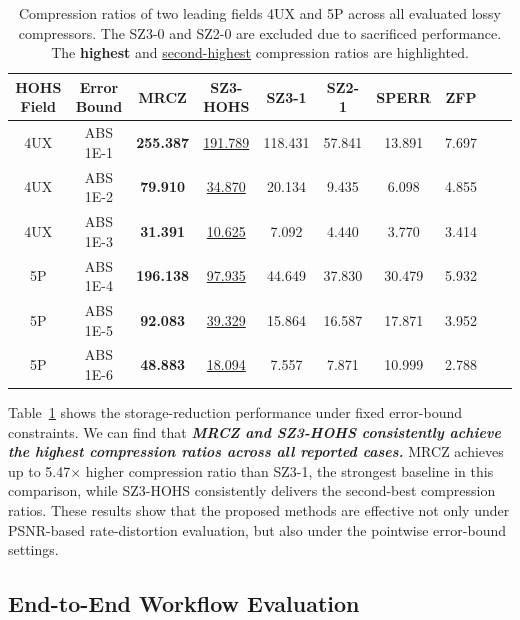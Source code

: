 \begin{table}[h]
    \centering
    \caption{Compression ratios of two leading fields 4UX and 5P across all evaluated lossy compressors. The SZ3-0 and SZ2-0 are excluded due to sacrificed performance. The \textbf{highest} and \underline{second-highest} compression ratios are highlighted.}
    \label{tab:compression-ratios}
    \begin{tabular}{c|c|cccccccc}\toprule
        \textbf{HOHS Field} & \textbf{Error Bound} & \textbf{MRCZ}    & \textbf{SZ3-HOHS} & \textbf{SZ3-1}   & \textbf{SZ2-1}  & \textbf{SPERR}  & \textbf{ZFP} \\
        \midrule
        4UX                     & ABS 1E-1   & \textbf{255.387} & \underline{191.789}  & 118.431 & 57.841 & 13.891 & 7.697\\
        4UX                     & ABS 1E-2   & \textbf{79.910}  & \underline{34.870}   & 20.134  & 9.435  & 6.098  & 4.855\\
        4UX                     & ABS 1E-3   & \textbf{31.391}  & \underline{10.625}   & 7.092   & 4.440  & 3.770  & 3.414\\
        \midrule
        5P                      & ABS 1E-4   & \textbf{196.138} & \underline{97.935}   & 44.649  & 37.830 & 30.479 & 5.932\\
        5P                      & ABS 1E-5   & \textbf{92.083}  & \underline{39.329}   & 15.864  & 16.587 & 17.871 & 3.952\\
        5P                      & ABS 1E-6   & \textbf{48.883}  & \underline{18.094}   & 7.557   & 7.871  & 10.999 & 2.788\\\bottomrule
    \end{tabular}
\end{table}

Table~\ref{tab:compression-ratios} shows the storage-reduction performance under fixed error-bound constraints. We can find that \textbf{\textit{MRCZ and SZ3-HOHS consistently achieve the highest compression ratios across all reported cases.}} MRCZ achieves up to 5.47$\times$ higher compression ratio than SZ3-1, the strongest baseline in this comparison, while SZ3-HOHS consistently delivers the second-best compression ratios. These results show that the proposed methods are effective not only under PSNR-based rate-distortion evaluation, but also under the pointwise error-bound settings.

\subsection{End-to-End Workflow Evaluation}

